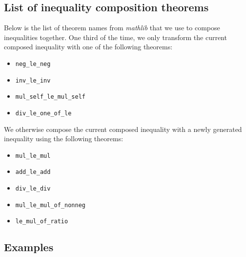 \documentclass[nohyperref]{article}
\theoremstyle{plain}
\theoremstyle{definition}
\theoremstyle{remark}
\begin{document}
\subsection{List of inequality composition theorems}
\label{appendix-ineq-composition}

Below is the list of theorem names from \textit{mathlib} that we use to compose inequalities together. One third of the time, we only transform the current composed inequality with one of the following theorems:

\begin{itemize}
    \item \texttt{neg\_le\_neg} 
    \item \texttt{inv\_le\_inv}
    \item \texttt{mul\_self\_le\_mul\_self}
    \item \texttt{div\_le\_one\_of\_le}
\end{itemize}

We otherwise compose the current composed inequality with a newly generated inequality using the following theorems:

\begin{itemize}
    \item \texttt{mul\_le\_mul}
    \item \texttt{add\_le\_add}
    \item \texttt{div\_le\_div}
    \item \texttt{mul\_le\_mul\_of\_nonneg}
    \item \texttt{le\_mul\_of\_ratio}
\end{itemize}

\subsection{Examples}
\label{appendix-ineq-examples}
\end{document}

